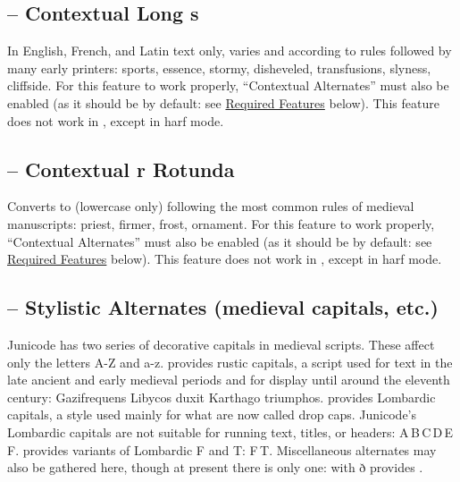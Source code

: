 \subsection{ --
Contextual Long s}
In English, French, and Latin text only, varies  and  according to rules
followed by many early printers: {\colongs sports, essence, stormy, disheveled, transfusions, slyness, cliffside}. For this
feature to work properly,  ``Contextual Alternates'' must also be enabled (as it should be by
default: see \hyperlink{req}{Required Features} below). This feature does not work in {\ltech}, except in harf mode.

\subsection{ --
Contextual r Rotunda}\hypertarget{ss16}{}
Converts  to  (lowercase only) following the
most common rules of medieval manuscripts: {priest, firmer, frost, ornament}. For this feature to work properly,
 ``Contextual Alternates'' must also be enabled (as it should be by default: see
\hyperlink{req}{Required Features} below).  This feature does not work in {\ltech}, except in harf mode.

\subsection{ --
Stylistic Alternates (medieval capitals, etc.)}\hypertarget{salt}{}
Junicode has two series of decorative capitals in medieval scripts. These affect only the letters
A-Z and a-z.  provides rustic capitals, a script used for text in the late
ancient and early medieval periods and for display until around the eleventh century:
{Gazifrequens Libycos duxit Karthago triumphos}. 
provides Lombardic capitals, a style used mainly for what are now called drop caps. Junicode’s Lombardic capitals
are not suitable for running text, titles, or headers:
{A\,B\,C\,D\,E\,F}.
 provides variants of Lombardic F and T:
{F\,T}. Miscellaneous alternates may also be gathered here, though
at present there is only one:  with ð provides
.

